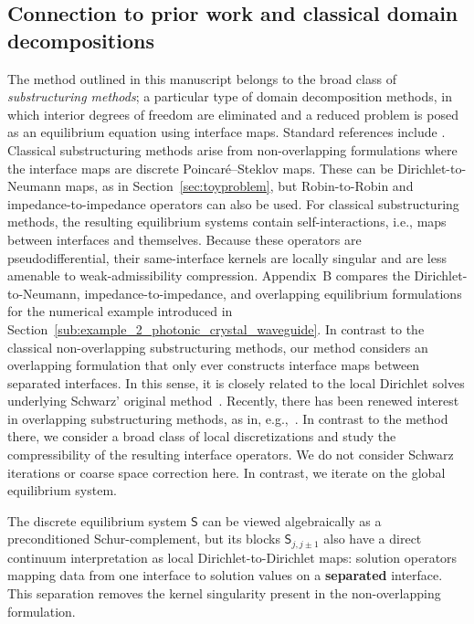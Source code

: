 \documentclass[final,onefignum,onetabnum]{siamart250211}
\newcommand{\mtx}[1]{\bm{\mathsf{#1}}}
\theoremstyle{definition}
\begin{document}
\subsection{Connection to prior work and classical domain decompositions}
The method outlined in this manuscript belongs to the broad class of \textit{substructuring methods}; a particular type of domain decomposition methods, in which interior degrees of freedom are eliminated and a reduced problem is posed as an equilibrium equation using interface maps. Standard references include \cite{smithDD,toselliWidlundDD}. Classical substructuring methods arise from non-overlapping formulations where the interface maps are discrete Poincar\'e--Steklov maps. These can be Dirichlet-to-Neumann maps, as in Section~\ref{sec:toyproblem}, but Robin-to-Robin and impedance-to-impedance operators can also be used. For classical substructuring methods, the resulting equilibrium systems contain self-interactions, i.e., maps between interfaces and themselves. 
Because these operators are pseudodifferential, their same-interface kernels are locally singular and are less amenable to weak-admissibility compression.
Appendix~B compares the Dirichlet-to-Neumann, impedance-to-impedance, and overlapping equilibrium formulations for the numerical example introduced in Section~\ref{sub:example_2_photonic_crystal_waveguide}. In contrast to the classical non-overlapping substructuring methods, our method considers an overlapping formulation that only ever constructs interface maps between separated interfaces. 
In this sense, it is closely related to the local Dirichlet solves underlying Schwarz' original method~\cite{Schwarz1870}.
Recently, there has been renewed interest in overlapping substructuring methods, as in, e.g.,~\cite{Ciaramella2022}. 
In contrast to the method there, we consider a broad class of local discretizations and study the compressibility of the resulting interface operators.
We do not consider Schwarz iterations or coarse space correction here. In contrast, we iterate on the global equilibrium system.

The  discrete equilibrium system $\mtx{S}$ can be viewed algebraically as a preconditioned Schur-complement, but its blocks $\mtx{S}_{j,j\pm1}$ also have a direct continuum interpretation as local Dirichlet-to-Dirichlet maps: solution operators mapping data from one interface to solution values on a \textbf{separated} interface. This separation removes the kernel singularity present in the non-overlapping formulation.
\end{document}
